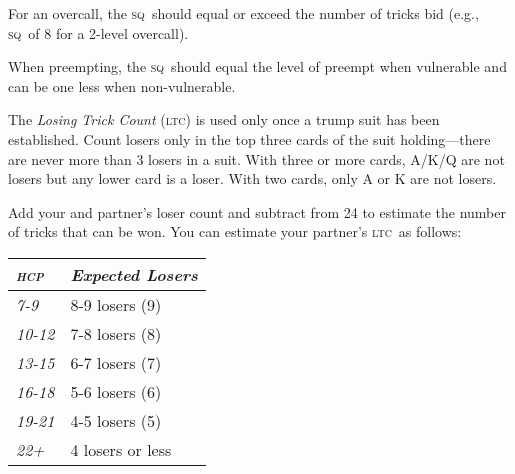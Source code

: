 \documentclass[a4paper,article,oneside]{memoir}
\newcommand{\gap}{\vspace{\baselineskip}}
\newcommand{\hcp}{\textsc{hcp}}
\newcommand{\sq}{\textsc{sq}}
\newcommand{\ltc}{\textsc{ltc}}
\begin{document}
For an overcall, the \sq\ should equal or exceed the number of tricks
bid (e.g., \sq\ of 8 for a 2-level overcall).

When preempting, the \sq\ should equal the level of preempt when
vulnerable and can be one less when non-vulnerable.

\gap

The \emph{Losing Trick Count} (\ltc) is used only once a trump suit
has been established. Count losers only in the top three cards of the
suit holding---there are never more than 3 losers in a suit. With
three or more cards, A/K/Q are not losers but any lower card is a
loser. With two cards, only A or K are not losers.

Add your and partner's loser count and subtract from 24 to estimate
the number of tricks that can be won.  You can estimate your partner's
\ltc\ as follows:

\begin{tabular}{p{1.5cm}p{9cm}}
  \emph{\hcp{}} & \emph{Expected Losers} \\
  \hline
  \emph{7-9} & 8-9 losers (9) \\
  \emph{10-12} & 7-8 losers (8) \\
  \emph{13-15} & 6-7 losers (7) \\
  \emph{16-18} & 5-6 losers (6) \\
  \emph{19-21} & 4-5 losers (5) \\
  \emph{22+} & 4 losers or less \\
  \hline
\end{tabular}
\end{document}
